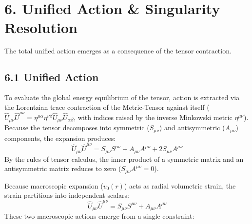 





\section*{6. Unified Action \& Singularity Resolution}
The total unified action emerges as a consequence of the tensor contraction.

\subsection*{6.1 Unified Action}
To evaluate the global energy equilibrium of the tensor, action is extracted via the Lorentzian trace contraction of the Metric-Tensor against itself ($\hat{U}_{\mu\nu} \hat{U}^{\mu\nu} = \eta^{\mu\alpha}\eta^{\nu\beta}\hat{U}_{\mu\nu}\hat{U}_{\alpha\beta}$, with indices raised by the inverse Minkowski metric $\eta^{\mu\nu}$). Because the tensor decomposes into symmetric ($S_{\mu\nu}$) and antisymmetric ($A_{\mu\nu}$) components, the expansion produces: %
\begin{equation}
    \hat{U}_{\mu\nu} \hat{U}^{\mu\nu} = S_{\mu\nu} S^{\mu\nu} + A_{\mu\nu} A^{\mu\nu} + 2S_{\mu\nu} A^{\mu\nu}
\end{equation}
By the rules of tensor calculus, the inner product of a symmetric matrix and an antisymmetric matrix reduces to zero ($S_{\mu\nu} A^{\mu\nu} = 0$). 

Because macroscopic expansion ($v_0(r)$) acts as radial volumetric strain, the strain partitions into independent scalars:
\begin{equation}
    \hat{U}_{\mu\nu} \hat{U}^{\mu\nu} = S_{\mu\nu} S^{\mu\nu} + A_{\mu\nu} A^{\mu\nu}
\end{equation}
These two macroscopic actions emerge from a single constraint:

